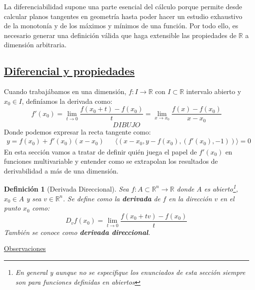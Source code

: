 \documentclass[10pt,a4paper,openright]{book}
\theoremstyle{break}
\newtheorem*{defi}{Definición}
\begin{document}
La diferenciabilidad supone una parte esencial del cálculo porque permite desde calcular planos tangentes en geometría hasta poder hacer un estudio exhaustivo de la monotonía y de los máximos y mínimos de una función. Por todo ello, es necesario generar una definición válida que haga extensible las propiedades de $\mathbb{R}$ a dimensión arbitraria.

\subsection*{\underline{Diferencial y propiedades}}
Cuando trabajábamos en una dimensión, $f: I \to \mathbb{R}$ con $I \subset \mathbb{R}$ intervalo abierto y $x_0 \in I$, definíamos la derivada como: 
$$f'(x_0)= \lim_{t \to 0} \frac{f(x_0 + t) - f(x_0) }{t} = \lim_{x \to x_0} \frac{f(x) - f(x_0)}{x - x_0}$$
$$DIBUJO$$
Donde podemos expresar la recta tangente como:
\begin{align*}
y= f(x_0) + f'(x_0)(x - x_0) & & \langle (x-x_0, y - f(x_0), (f'(x_0), - 1)) \rangle = 0 
\end{align*}
En esta sección vamos a tratar de definir quién juega el papel de $f'(x_0)$ en funciones multivariable y entender como se extrapolan los resultados de derivabilidad a más de una dimensión.

\begin{defi}[Derivada Direccional]
Sea $f:A \subset \mathbb{R}^n \to \mathbb{R}$ donde $A$ es abierto\footnote{En general y aunque no se especifique los enunciados de esta sección siempre son para funciones definidas en abiertos}, $x_0 \in A$ y sea $v \in \mathbb{R}^n$. Se define como la \textbf{derivada} de $f$ en la dirección $v$ en el punto $x_0$ como:
$$D_v f(x_0) = \lim_{t \to 0} \frac{f(x_0 + tv) - f(x_0)}{t}$$
También se conoce como \textbf{derivada direccional}.
\end{defi}

\underline{Observaciones}
\end{document}
